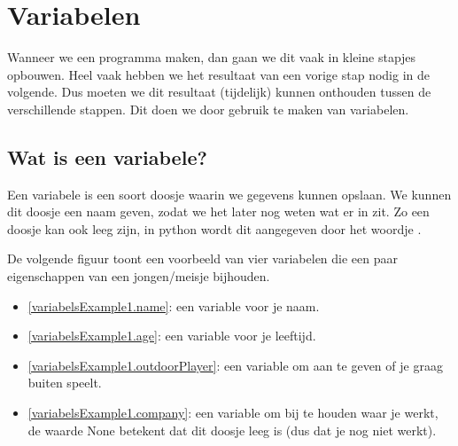 \section{Variabelen}
\label{sec:variabelen}

Wanneer we een programma maken, dan gaan we dit vaak in kleine stapjes opbouwen.
Heel vaak hebben we het resultaat van een vorige stap nodig in de volgende.
Dus moeten we dit resultaat (tijdelijk) kunnen onthouden tussen de verschillende stappen.
Dit doen we door gebruik te maken van variabelen.

\subsection{Wat is een variabele?}

Een variabele is een soort doosje waarin we gegevens kunnen opslaan.
We kunnen dit doosje een naam geven, zodat we het later nog weten wat er in zit.
Zo een doosje kan ook leeg zijn, in python wordt dit aangegeven door het woordje .
\par
De volgende figuur toont een voorbeeld van vier variabelen die een paar eigenschappen van een jongen/meisje bijhouden.
\begin{itemize}
	\item
		\ref{variabelsExample1.name}: een variable  voor je naam.
	\item
		\ref{variabelsExample1.age}: een variable  voor je leeftijd.
	\item
		\ref{variabelsExample1.outdoorPlayer}: een variable  om aan te geven of je graag buiten speelt.
	\item
		\ref{variabelsExample1.company}: een variable  om bij te houden waar je werkt,
		de waarde None betekent dat dit doosje leeg is (dus dat je nog niet werkt).
\end{itemize}

